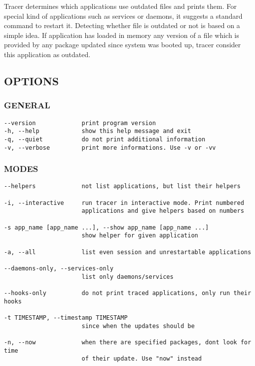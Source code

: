 Tracer determines which applications use outdated files and prints them. For special kind of applications such as services or daemons, it suggests a standard command to restart it. Detecting whether file is outdated or not is based on a simple idea. If application has loaded in memory any version of a file which is provided by any package updated since system was booted up, tracer consider this application as outdated.


\subsection{OPTIONS%
  \label{options}%
}


\subsubsection{GENERAL%
  \label{general}%
}
%

\begin{lstlisting}
--version             print program version
-h, --help            show this help message and exit
-q, --quiet           do not print additional information
-v, --verbose         print more informations. Use -v or -vv
\end{lstlisting}


\subsubsection{MODES%
  \label{modes}%
}
%

\begin{lstlisting}
--helpers             not list applications, but list their helpers

-i, --interactive     run tracer in interactive mode. Print numbered
                      applications and give helpers based on numbers

-s app_name [app_name ...], --show app_name [app_name ...]
                      show helper for given application

-a, --all             list even session and unrestartable applications

--daemons-only, --services-only
                      list only daemons/services

--hooks-only          do not print traced applications, only run their hooks

-t TIMESTAMP, --timestamp TIMESTAMP
                      since when the updates should be

-n, --now             when there are specified packages, dont look for time
                      of their update. Use "now" instead
\end{lstlisting}


